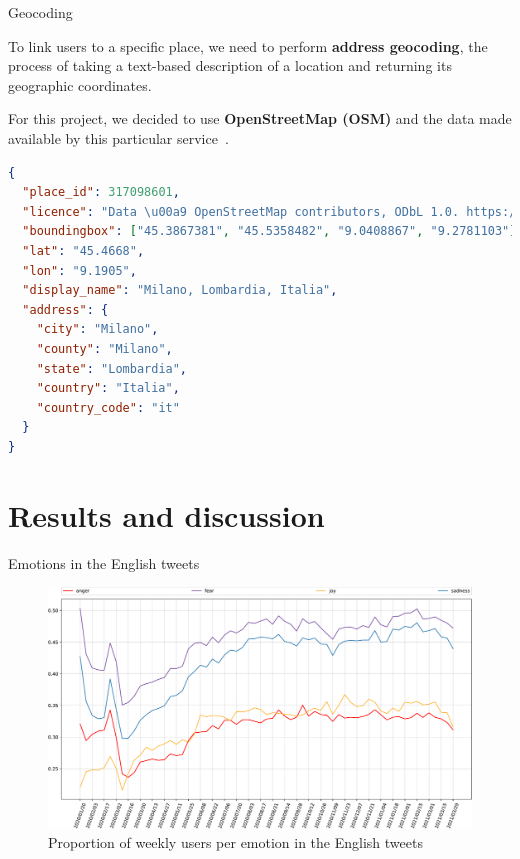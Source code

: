 \documentclass[8pt]{beamer}  %
\begin{document}
\begin{frame}[fragile]{Geocoding}
    
    To link users to a specific place, we need to perform \textbf{address geocoding}, the process of taking a text-based description of a location and returning its geographic coordinates.
    
    For this project, we decided to use \textbf{OpenStreetMap (OSM)} and the data made available by this particular service~\autocite{osm}.
    
\begin{lstlisting}[language=json, caption={Json object returned by Geopy given “Milano, Lombardia” as input}, captionpos=b, label={lst:nominatim-geocode}]
{
  "place_id": 317098601, 
  "licence": "Data \u00a9 OpenStreetMap contributors, ODbL 1.0. https://osm.org/copyright",
  "boundingbox": ["45.3867381", "45.5358482", "9.0408867", "9.2781103"], 
  "lat": "45.4668", 
  "lon": "9.1905", 
  "display_name": "Milano, Lombardia, Italia",
  "address": {
    "city": "Milano", 
    "county": "Milano",
    "state": "Lombardia", 
    "country": "Italia", 
    "country_code": "it"
  }
}
\end{lstlisting}
    
\end{frame}

\section{Results and discussion}

\begin{frame}{Emotions in the English tweets}

    \begin{figure}[H]
    	\centering
    	\includegraphics[scale=.25]{assets/img/en_4_emotions.svg.pdf}
    	\caption{Proportion of weekly users per emotion in the English tweets}
    	\label{fig:en-4-emotions}
    \end{figure}
    
\end{frame}
\end{document}
